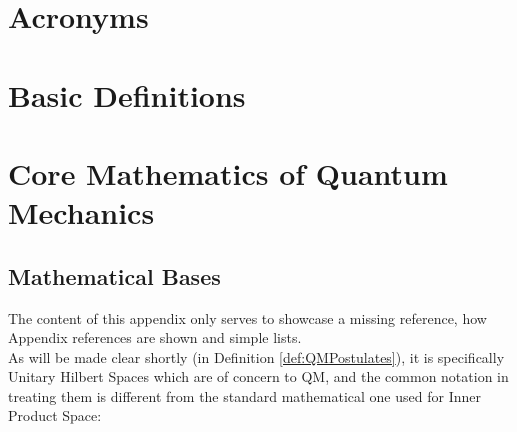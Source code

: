 \documentclass[a4paper,12pt]{article}
\begin{document}
\printbibliography



\appendix

\section{Acronyms}
\label{sec:Acronyms}

\printacronyms

\section{Basic Definitions}
\label{sec:BasicDefs}

\printglossary




\section{Core Mathematics of Quantum Mechanics}
\label{sec:CoreMathsOfQM}



\subsection{Mathematical Bases}
\label{sec:SubMathBases}

The content of this appendix only serves to showcase a missing reference, how Appendix references are shown and simple lists.\\

As will be made clear shortly (in Definition \ref{def:QMPostulates}), it is specifically \gls{Unitary} Hilbert Spaces which are of concern to \gls{QM},
and the common notation in treating them is different from the standard mathematical one used for Inner Product Space:
\end{document}
